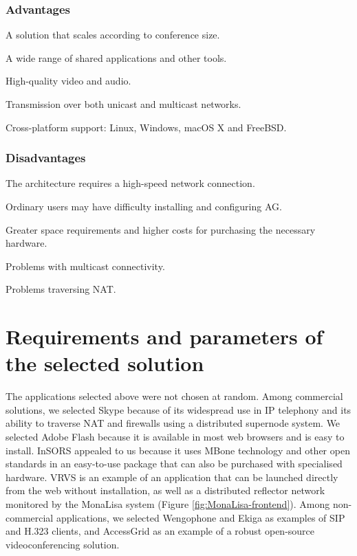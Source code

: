 \subsubsection*{Advantages}
\begin{paklist}
\item A solution that scales according to conference size.
\item A wide range of shared applications and other tools.
\item High-quality video and audio.
\item Transmission over both unicast and multicast networks.
\item Cross-platform support: Linux, Windows, macOS X and FreeBSD.
\end{paklist}

\subsubsection*{Disadvantages}
\begin{paklist}
\item The architecture requires a high-speed network connection.
\item Ordinary users may have difficulty installing and configuring AG.
\item Greater space requirements and higher costs for purchasing the necessary hardware.
\item Problems with multicast connectivity.
\item Problems traversing NAT.
\end{paklist}


\section{Requirements and parameters of the selected solution}

The applications selected above were not chosen at random. Among commercial solutions, we selected Skype because of its widespread use in IP telephony and its ability to traverse NAT and firewalls using a distributed supernode system. We selected Adobe Flash because it is available in most web browsers and is easy to install. InSORS appealed to us because it uses MBone technology and other open standards in an easy-to-use package that can also be purchased with specialised hardware. VRVS is an example of an application that can be launched directly from the web without installation, as well as a distributed reflector network monitored by the MonaLisa system (Figure \ref{fig:MonaLisa-frontend}). Among non-commercial applications, we selected Wengophone and Ekiga as examples of SIP and H.323 clients, and AccessGrid as an example of a robust open-source videoconferencing solution.

